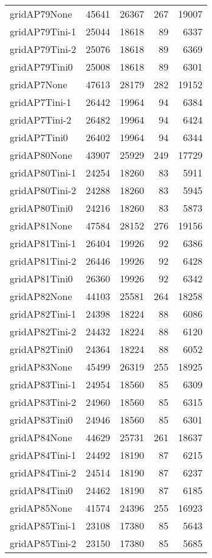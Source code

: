 \begin{longtable}{lrrrr}
gridAP79None & 45641 & 26367 & 267 & 19007 \\
gridAP79Tini-1 & 25044 & 18618 & 89 & 6337 \\
gridAP79Tini-2 & 25076 & 18618 & 89 & 6369 \\
gridAP79Tini0 & 25008 & 18618 & 89 & 6301 \\
gridAP7None & 47613 & 28179 & 282 & 19152 \\
gridAP7Tini-1 & 26442 & 19964 & 94 & 6384 \\
gridAP7Tini-2 & 26482 & 19964 & 94 & 6424 \\
gridAP7Tini0 & 26402 & 19964 & 94 & 6344 \\
gridAP80None & 43907 & 25929 & 249 & 17729 \\
gridAP80Tini-1 & 24254 & 18260 & 83 & 5911 \\
gridAP80Tini-2 & 24288 & 18260 & 83 & 5945 \\
gridAP80Tini0 & 24216 & 18260 & 83 & 5873 \\
gridAP81None & 47584 & 28152 & 276 & 19156 \\
gridAP81Tini-1 & 26404 & 19926 & 92 & 6386 \\
gridAP81Tini-2 & 26446 & 19926 & 92 & 6428 \\
gridAP81Tini0 & 26360 & 19926 & 92 & 6342 \\
gridAP82None & 44103 & 25581 & 264 & 18258 \\
gridAP82Tini-1 & 24398 & 18224 & 88 & 6086 \\
gridAP82Tini-2 & 24432 & 18224 & 88 & 6120 \\
gridAP82Tini0 & 24364 & 18224 & 88 & 6052 \\
gridAP83None & 45499 & 26319 & 255 & 18925 \\
gridAP83Tini-1 & 24954 & 18560 & 85 & 6309 \\
gridAP83Tini-2 & 24960 & 18560 & 85 & 6315 \\
gridAP83Tini0 & 24946 & 18560 & 85 & 6301 \\
gridAP84None & 44629 & 25731 & 261 & 18637 \\
gridAP84Tini-1 & 24492 & 18190 & 87 & 6215 \\
gridAP84Tini-2 & 24514 & 18190 & 87 & 6237 \\
gridAP84Tini0 & 24462 & 18190 & 87 & 6185 \\
gridAP85None & 41574 & 24396 & 255 & 16923 \\
gridAP85Tini-1 & 23108 & 17380 & 85 & 5643 \\
gridAP85Tini-2 & 23150 & 17380 & 85 & 5685 \\

\end{longtable}
